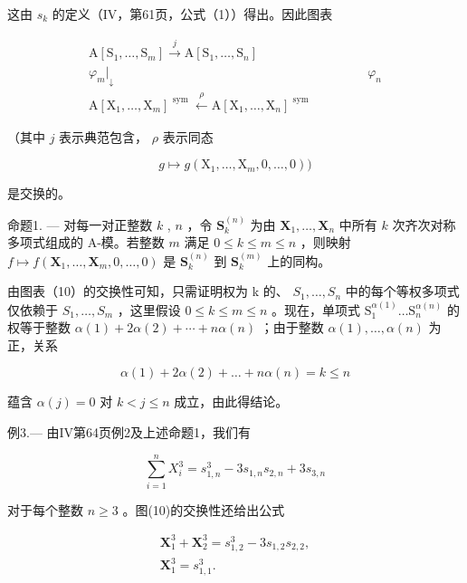 这由 \(s_k\) 的定义（IV，第61页，公式（1））得出。因此图表

\[
\begin{array}{c} \mathrm{A} [ \mathrm{S} _ {1}, \dots , \mathrm{S} _ {m} ] \xrightarrow {j} \mathrm{A} [ \mathrm{S} _ {1}, \dots , \mathrm{S} _ {n} ] \\ \varphi_ {m} \Bigg | _ {\downarrow} \qquad \qquad \qquad \qquad \qquad \qquad \qquad \qquad \qquad \qquad \varphi_ {n} \\ \mathrm{A} [ \mathrm{X} _ {1}, \dots , \mathrm{X} _ {m} ] ^ {\text { sym }} \xleftarrow {\rho} \mathrm{A} [ \mathrm{X} _ {1}, \dots , \mathrm{X} _ {n} ] ^ {\text { sym }} \end{array}\tag{10}
\]

（其中 \(j\) 表示典范包含， \(\rho\) 表示同态

\[
g \mapsto g \left(\mathrm{X} _ {1}, \dots , \mathrm{X} _ {m}, 0, \dots , 0\right))
\]

是交换的。

命题1. --- 对每一对正整数 \(k\) , \(n\) ，令 \(\mathbf{S}_{k}^{(n)}\) 为由 \(\mathbf{X}_{1},\ldots,\mathbf{X}_{n}\) 中所有 \(k\) 次齐次对称多项式组成的 A-模。若整数 \(m\) 满足 \(0\leqslant k\leqslant m\leqslant n\) ，则映射 \(f\mapsto f(\mathbf{X}_{1},\ldots,\mathbf{X}_{m},0,\ldots,0)\) 是 \(\mathbf{S}_{k}^{(n)}\) 到 \(\mathbf{S}_{k}^{(m)}\) 上的同构。

由图表（10）的交换性可知，只需证明权为 k 的、 \(S_{1}, \ldots, S_{n}\) 中的每个等权多项式仅依赖于 \(S_{1}, \ldots, S_{m}\) ，这里假设 \(0 \leqslant k \leqslant m \leqslant n\) 。现在，单项式 \(\mathrm{S}_{1}^{\alpha(1)} \ldots \mathrm{S}_{n}^{\alpha(n)}\) 的权等于整数 \(\alpha(1) + 2\alpha(2) + \cdots + n\alpha(n)\) ；由于整数 \(\alpha(1), \ldots, \alpha(n)\) 为正，关系

\[
\alpha (1) + 2 \alpha (2) + \dots + n \alpha (n) = k \leqslant n
\]

蕴含 \(\alpha(j) = 0\) 对 \(k < j \leqslant n\) 成立，由此得结论。

例3.--- 由IV第64页例2及上述命题1，我们有

\[
\sum_ {i = 1} ^ {n} X _ {i} ^ {3} = s _ {1, n} ^ {3} - 3 s _ {1, n} s _ {2, n} + 3 s _ {3, n}
\]

对于每个整数 \(n \geqslant 3\) 。图(10)的交换性还给出公式

\[
\begin{array}{c} \mathbf {X} _ {1} ^ {3} + \mathbf {X} _ {2} ^ {3} = s _ {1, 2} ^ {3} - 3 s _ {1, 2} s _ {2, 2}, \\ \mathbf {X} _ {1} ^ {3} = s _ {1, 1} ^ {3}. \end{array}
\]


